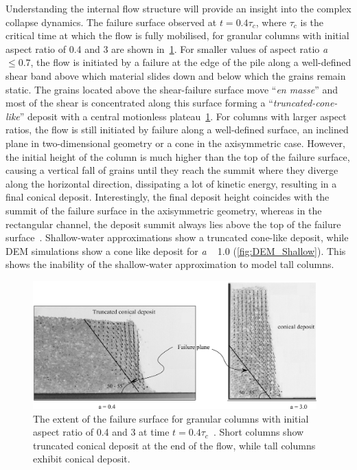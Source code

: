 Understanding the internal flow structure will provide an insight into the 
complex collapse dynamics. The failure surface observed at $t 
= 0.4 \tau_c$, where $\tau_c$ is the critical time at which the flow is fully 
mobilised, for granular columns with initial aspect ratio of 0.4 and 3 are 
shown in~\cref{fig:Deposit}.  For smaller values of aspect ratio \textit{a} 
$\le 0.7$, the flow is initiated by a failure at the edge of the pile along a 
well-defined shear band above which material slides down and below 
which the grains remain static. The grains located above the shear-failure 
surface move ``\textit{en masse}'' and most of the shear is concentrated along 
this surface forming a ``\textit{truncated-cone-like}'' deposit with a central 
motionless plateau~\cref{fig:Deposit}. For columns with larger aspect ratios, 
the flow is still initiated by failure along a well-defined surface, an 
inclined plane in two-dimensional geometry or a cone in the axisymmetric case. 
However, the initial height of the column is much higher than the top of the 
failure surface, causing a vertical fall of grains until they reach the summit 
where they diverge along the horizontal direction, dissipating a lot of kinetic 
energy, resulting in a final conical deposit. Interestingly, the final deposit 
height coincides with the summit of the failure surface in the axisymmetric 
geometry, whereas in the rectangular channel, the deposit summit always lies 
above the top of the failure surface~\citep{Lajeunesse2005}. Shallow-water 
approximations show a truncated cone-like deposit, while DEM simulations show 
a cone like deposit for \textit{a} ~ 1.0 (\cref{fig:DEM_Shallow}). This shows 
the inability of the shallow-water approximation to model tall columns.

\begin{figure}[tbhp]
\centering
\includegraphics[width=0.975\textwidth]{Deposit}
\caption{The extent of the failure surface for granular columns with initial 
aspect ratio of 0.4 and 3 at time $t= 0.4\tau_c$~\citep{Lajeunesse2004}. Short 
columns show truncated conical deposit at the end of the flow, while tall 
columns exhibit conical deposit.}
\label{fig:Deposit}
\end{figure}


